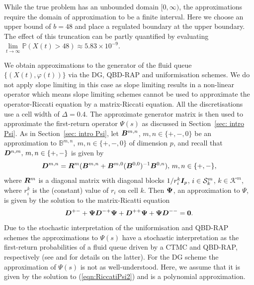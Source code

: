 While the true problem has an unbounded domain $[0,\infty)$, the approximations require the domain of approximation to be a finite interval. Here we choose an upper bound of \(b=48\) and place a regulated boundary at the upper boundary. The effect of this truncation can be partly quantified by evaluating \(\lim\limits_{t\to\infty}\mathbb P\left(X(t) > 48\right)\approx 5.83 \times 10^{-9}\). 

We obtain approximations to the generator of the fluid queue \(\{(X(t),\varphi(t))\}\) via the DG, QBD-RAP and uniformisation schemes. We do not apply slope limiting in this case as slope limiting results in a non-linear operator which means slope limiting schemes cannot be used to approximate the operator-Riccati equation by a matrix-Riccati equation. All the discretisations use a cell width of \(\Delta=0.4\). The approximate generator matrix is then used to approximate the first-return operator \(\mathbb\Psi(s)\) as discussed in Section~\ref{sec: intro Psi}. As in Section~\ref{sec: intro Psi}, let \(\boldsymbol{B}^{m,n}\), \(m,n\in\{+,-,0\}\) be an approximation to \(\mathbb B^{m,n},\, m,n\in\{+,-,0\}\) of dimension \(p\), and recall that \(\boldsymbol{D}^{n,m},\,m,n\in\{+,-\}\) is given by 
\[\boldsymbol D^{m,n} = \boldsymbol{R}^m (\boldsymbol{B}^{m,n} + \boldsymbol{B}^{m,0}(\boldsymbol B^{0,0})^{-1}\boldsymbol{B}^{0,n}), \, m,n\in\{+,-\}, \]
where \(\boldsymbol R^m\) is a diagonal matrix with diagonal blocks \(1/r_i^k\boldsymbol{I}_p\), \(i\in\mathcal{S}_k^m\), \(k\in\mathcal K^m\), where \(r_i^k\) is the (constant) value of \(r_i\) on cell \(k\).
Then \(\boldsymbol{\Psi}\), an approximation to \(\mathbb \Psi\), is given by the solution to the matrix-Ricatti equation 
\begin{align}\label{eqn:RiccatiPsi2}
    \boldsymbol D^{+-}
+ \boldsymbol \Psi   \boldsymbol D^{-+}\boldsymbol \Psi
+   \boldsymbol D^{++}\boldsymbol \Psi
+ \boldsymbol \Psi  \boldsymbol D^{--}
= \boldsymbol 0.
\end{align}
Due to the stochastic interpretation of the uniformisation and QBD-RAP schemes the approximations to \(\mathbb \Psi(s)\) have a stochastic interpretation as the first-return probabilities of a fluid queue driven by a CTMC and QBD-RAP, respectively (see \cite[Chapter~7]{p2019} and \cite{bgnp2021} for details on the latter). For the DG scheme the approximation of \(\mathbb \Psi(s)\) is not as well-understood. Here, we assume that it is given by the solution to (\ref{eqn:RiccatiPsi2}) and is a polynomial approximation. %

